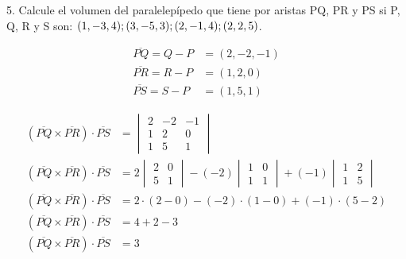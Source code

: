 \documentclass{article}
\begin{document}
5. Calcule el volumen del paralelepípedo que tiene por aristas PQ, PR y PS si
P, Q, R y S son: $(1, -3, 4);\\(3,-5,3); (2,-1,4); (2,2,5)$.

\begin{align*}
    \overline{PQ} = Q - P & = (2, -2, -1) \\
    \overline{PR} = R - P & = (1, 2, 0)   \\
    \overline{PS} = S - P & = (1, 5, 1)
\end{align*}

\begin{align*}
    \left(\overline{PQ} \times \overline{PR}\right) \cdot \overline{PS} & = \begin{vmatrix}
                                                                                2 & -2 & -1 \\
                                                                                1 & 2  & 0  \\
                                                                                1 & 5  & 1
                                                                            \end{vmatrix} \\
    \left(\overline{PQ} \times \overline{PR}\right) \cdot \overline{PS} & =
    2 \begin{vmatrix}
          2 & 0 \\
          5 & 1
      \end{vmatrix} - (-2) \begin{vmatrix}
                               1 & 0 \\
                               1 & 1
                           \end{vmatrix} + (-1) \begin{vmatrix}
                                                    1 & 2 \\
                                                    1 & 5
                                                \end{vmatrix}                             \\
    \left(\overline{PQ} \times \overline{PR}\right) \cdot \overline{PS} & =
    2 \cdot (2 - 0) - (-2) \cdot (1 - 0) + (-1) \cdot (5 - 2)                              \\
    \left(\overline{PQ} \times \overline{PR}\right) \cdot \overline{PS} & = 4 + 2 - 3      \\
    \left(\overline{PQ} \times \overline{PR}\right) \cdot \overline{PS} & = \boxed{3}
\end{align*}
\end{document}
